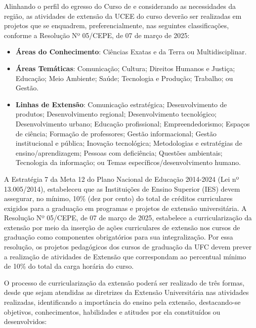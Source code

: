 Alinhando o perfil do egresso do Curso de \nomedocurso e considerando as necessidades da região, as atividades de extensão da UCEE do curso deverão ser realizadas em projetos que se enquadrem, preferencialmente, nas seguintes classificações, conforme a Resolução Nº 05/CEPE, de 07 de março de 2025:

\begin{itemize}
    \item \textbf{Áreas do Conhecimento}: Ciências Exatas e da Terra ou Multidisciplinar.
    \item \textbf{Áreas Temáticas}: Comunicação; Cultura; Direitos Humanos e Justiça; Educação; Meio Ambiente; Saúde; Tecnologia e Produção; Trabalho; ou Gestão.
    \item \textbf{Linhas de Extensão}: Comunicação estratégica; Desenvolvimento de produtos; Desenvolvimento regional; Desenvolvimento tecnológico; Desenvolvimento urbano; Educação profissional; Empreendedorismo; Espaços de ciência; Formação de professores; Gestão informacional; Gestão institucional e pública; Inovação tecnológica; Metodologias e estratégias de ensino/aprendizagem; Pessoas com deficiência; Questões ambientais;  Tecnologia da informação; ou Temas específicos/desenvolvimento humano.
\end{itemize}

A Estratégia 7 da Meta 12 do Plano Nacional de Educação 2014-2024 (Lei nº 13.005/2014), estabeleceu que as Instituições de Ensino Superior (IES) devem assegurar, no mínimo, 10\% (dez por cento) do total de créditos curriculares exigidos para a graduação em programas e projetos de extensão universitária. 
%
A Resolução Nº 05/CEPE, de 07 de março de 2025, estabelece a curricularização da extensão por meio da inserção de ações curriculares de extensão nos cursos de graduação como componentes obrigatórios para sua integralização. Por essa resolução, os projetos pedagógicos dos cursos de graduação da UFC devem prever a realização de atividades de Extensão que correspondam ao percentual mínimo de 10\% do total da carga horária do curso. %

O processo de curricularização da extensão poderá ser realizado de três formas, desde que sejam atendidas as diretrizes da Extensão Universitária nas atividades realizadas, identificando a importância do ensino pela extensão, destacando-se objetivos, conhecimentos, habilidades e atitudes por ela constituídos ou desenvolvidos: 

